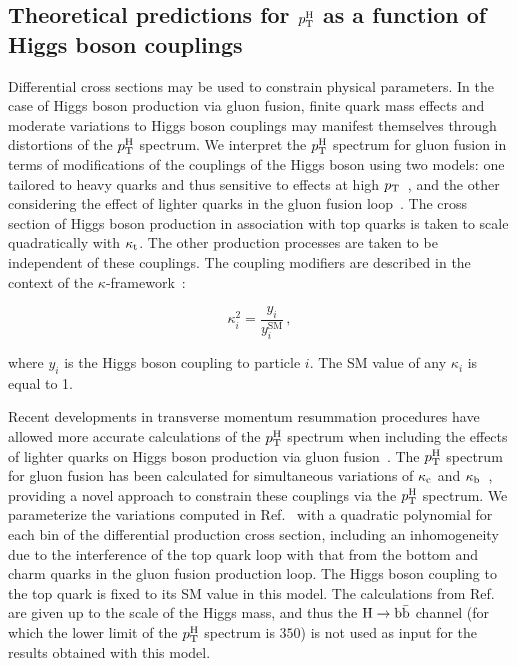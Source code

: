 \subsection{Theoretical predictions for \texorpdfstring{$p_\mathrm{T}^\mathrm{H}$}{pTH} as a function of Higgs boson couplings}


Differential cross sections may be used to constrain physical parameters.
% 
In the case of Higgs boson production via gluon fusion, finite quark mass effects and moderate variations to Higgs boson couplings may manifest themselves through distortions of the $p_\mathrm{T}^\mathrm{H}$ spectrum.
% 
We interpret the $p_\mathrm{T}^\mathrm{H}$ spectrum for gluon fusion in terms of modifications of the couplings of the Higgs boson using two models: one tailored to heavy quarks and thus sensitive to effects at high $p_\mathrm{T}$~\cite{Grazzini:2017szg,Grazzini:2016paz}, and the other considering the effect of lighter quarks in the gluon fusion loop~\cite{Bishara:2016jga}.
% 
The cross section of Higgs boson production in association with top quarks is taken to scale quadratically with $\kappa_{\mathrm{t}}$.
% 
The other production processes are taken to be independent of these couplings.
% 
The coupling modifiers are described in the context of the $\kappa$-framework~\cite{LHCHXSWG:YR3}:
% 
\begin{linenomath*}
\begin{equation}
\kappa_{i}^{2} = \frac{y_{i}}{y_{i}^{\text{SM}}}\,,
\end{equation}
\end{linenomath*}
% 
where $y_i$ is the Higgs boson coupling to particle $i$.
% 
The SM value of any $\kappa_i$ is equal to 1.


Recent developments in transverse momentum resummation procedures have allowed more accurate calculations of the $p_\mathrm{T}^\mathrm{H}$ spectrum when including the effects of lighter quarks on Higgs boson production via gluon fusion~\cite{Banfi:2013eda,Bozzi:2003jy,Becher:2010tm,Monni:2016ktx}.
% 
The $p_\mathrm{T}^\mathrm{H}$ spectrum for gluon fusion has been calculated for simultaneous variations of $\kappa_{\mathrm{c}}$ and $\kappa_{\mathrm{b}}$~\cite{Bishara:2016jga}, providing a novel approach to constrain these couplings via the $p_\mathrm{T}^\mathrm{H}$ spectrum.
% 
We parameterize the variations computed in Ref.~\cite{Bishara:2016jga} with a quadratic polynomial for each bin of the differential production cross section, including an inhomogeneity due to the interference of the top quark loop with that from the bottom and charm quarks in the gluon fusion production loop.
% 
The Higgs boson coupling to the top quark is fixed to its SM value in this model.
% 
The calculations from Ref.~\cite{Bishara:2016jga} are given up to the scale of the Higgs mass, and thus the $\mathrm{H}\to\mathrm{b}\bar{\mathrm{b}}$ channel (for which the lower limit of the $p_\mathrm{T}^\mathrm{H}$ spectrum is $350$\GeV) is not used as input for the results obtained with this model.


